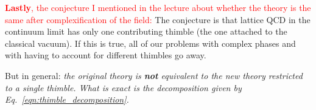 \documentclass[11pt]{article}
\theoremstyle{definition}
\begin{document}
\noindent \textcolor{red}{\textbf{Lastly}, the conjecture I mentioned in
the lecture about whether the theory is the same after complexification
of the field:} The conjecture is that lattice QCD in the continuum limit
has only one contributing thimble (the one attached to the classical
vacuum). If this is true, all of our problems with complex phases and with
having to account for different thimbles go away.

\medskip
\noindent
But in general: \textit{the original theory is \textbf{not} equivalent to
the new theory restricted to a single thimble. What is exact is the
decomposition given by Eq.~\eqref{eqn:thimble_decomposition}.}


\end{document}
